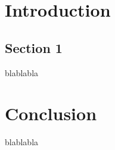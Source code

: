 \documentclass[french]{spimufchdr}
\begin{document}
 
\tableofcontents
 
\mainmatter

\chapter{Introduction}
 
\section{Section 1}
 
blablabla
 
\chapter{Conclusion}
 
blablabla
 
 
 
%
\listoffigures
\listoftables
 
\appendix
 
\end{document}
